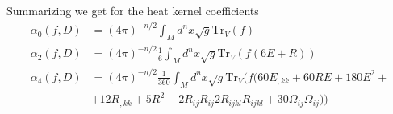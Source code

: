 \documentclass[a4paper]{article}
\theoremstyle{definition}
\theoremstyle{definition}
\theoremstyle{definition}
\theoremstyle{theorem}
\theoremstyle{theorem}
\theoremstyle{theorem}
\begin{document}
Summarizing we get for the heat kernel coefficients
\begin{align}
    \alpha_0(f, D) &= (4\pi)^{-n/2}\int_M d^n x \sqrt{g} \text{Tr}_V(f)\\
    \alpha_2(f, D) &= (4\pi)^{-n/2}\frac{1}{6}\int_M d^n x \sqrt{g}
    \text{Tr}_V(f(6E+R))\\
    \alpha_4(f, D) &= (4\pi)^{-n/2}\frac{1}{360}\int_M d^n x \sqrt{g}
    \text{Tr}_V(f(60E_{,kk}+60RE+ 180E^2 +\\
    &+12R_{,kk} + 5R^2 - 2 R_{ij}R_{ij}
    2R_{ijkl}R_{ijkl} +30\Omega_{ij}\Omega_{ij}))\\
\end{align}
\end{document}
